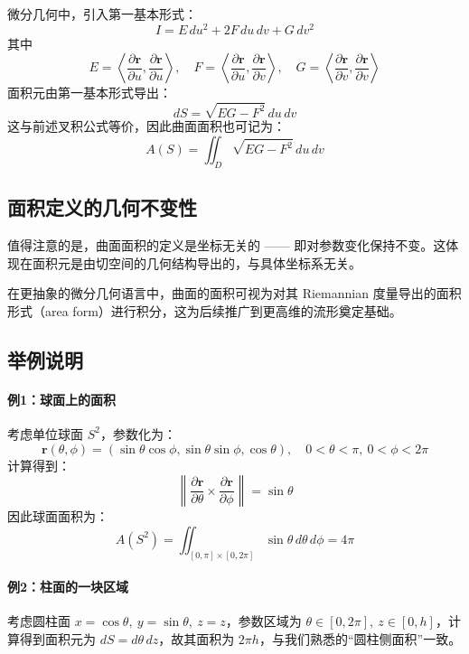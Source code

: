 \documentclass[a4paper, oneside]{article}
\begin{document}
微分几何中，引入第一基本形式：
\[
I = E\,du^2 + 2F\,du\,dv + G\,dv^2
\]
其中
\[
E = \left\langle \frac{\partial \boldsymbol{r}}{\partial u}, \frac{\partial \boldsymbol{r}}{\partial u} \right\rangle, \quad
F = \left\langle \frac{\partial \boldsymbol{r}}{\partial u}, \frac{\partial \boldsymbol{r}}{\partial v} \right\rangle, \quad
G = \left\langle \frac{\partial \boldsymbol{r}}{\partial v}, \frac{\partial \boldsymbol{r}}{\partial v} \right\rangle
\]
面积元由第一基本形式导出：
\[
dS = \sqrt{EG - F^2} \, du\,dv
\]
这与前述叉积公式等价，因此曲面面积也可记为：
\[
A(S) = \iint_D \sqrt{EG - F^2} \, du\,dv
\]

\subsection{面积定义的几何不变性}

值得注意的是，曲面面积的定义是坐标无关的 —— 即对参数变化保持不变。这体现在面积元是由切空间的几何结构导出的，与具体坐标系无关。

在更抽象的微分几何语言中，曲面的面积可视为对其 Riemannian 度量导出的面积形式（area form）进行积分，这为后续推广到更高维的流形奠定基础。

\subsection{举例说明}

\paragraph{例1：球面上的面积}

考虑单位球面 $S^2$，参数化为：
\[
\boldsymbol{r}(\theta,\phi) = (\sin\theta \cos\phi, \sin\theta \sin\phi, \cos\theta),\quad 0 < \theta < \pi,\ 0 < \phi < 2\pi
\]
计算得到：
\[
\left\| \frac{\partial \boldsymbol{r}}{\partial \theta} \times \frac{\partial \boldsymbol{r}}{\partial \phi} \right\| = \sin\theta
\]
因此球面面积为：
\[
A(S^2) = \iint_{[0,\pi] \times [0,2\pi]} \sin\theta \, d\theta\,d\phi = 4\pi
\]

\paragraph{例2：柱面的一块区域}

考虑圆柱面 $x = \cos\theta,\ y = \sin\theta,\ z = z$，参数区域为 $\theta \in [0, 2\pi],\ z \in [0, h]$，计算得到面积元为 $dS = d\theta\,dz$，故其面积为 $2\pi h$，与我们熟悉的“圆柱侧面积”一致。
\end{document}
